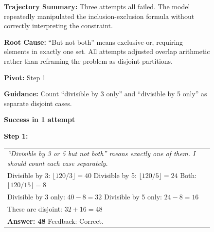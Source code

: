 \begin{figure}[b]
\begin{tcolorbox}
\end{tcolorbox}

\vspace{0.5em}

\begin{tcolorbox}[
    colback=gray!8,
    colframe=black!70,
    title=\textbf{Reflection Output},
    fonttitle=\bfseries\small,
    width=\textwidth,
    boxrule=0.5pt
]
\footnotesize

\textbf{Trajectory Summary:} Three attempts all failed. The model repeatedly manipulated the inclusion-exclusion formula without correctly interpreting the constraint.

\vspace{0.3em}
\textbf{Root Cause:} ``But not both'' means exclusive-or, requiring elements in exactly one set. All attempts adjusted overlap arithmetic rather than reframing the problem as disjoint partitions.

\vspace{0.3em}
\textbf{Pivot:} Step 1

\vspace{0.3em}
\textbf{Guidance:} Count ``divisible by 3 only'' and ``divisible by 5 only'' as separate disjoint cases.

\end{tcolorbox}

\vspace{0.5em}

\begin{tcolorbox}[
    colback=white,
    colframe=black!70,
    title=\textbf{Retry Trajectory (guidance removed for training)},
    fonttitle=\bfseries\small,
    width=\textwidth,
    boxrule=0.5pt
]

\hfill \textcolor{green!50!black}{\textbf{Success in 1 attempt}}

\vspace{0.5em}

\textbf{Step 1:}\par
\footnotesize
\begin{tabularx}{\linewidth}{@{}X@{}}
\textit{``Divisible by 3 or 5 but not both'' means exactly one of them. I should count each case separately.} \\[0.2em]
Divisible by 3: $\lfloor 120/3 \rfloor = 40$ \quad Divisible by 5: $\lfloor 120/5 \rfloor = 24$ \quad Both: $\lfloor 120/15 \rfloor = 8$ \\[0.2em]
Divisible by 3 only: $40 - 8 = 32$ \quad Divisible by 5 only: $24 - 8 = 16$ \\[0.2em]
These are disjoint: $32 + 16 = 48$ \\[0.2em]
\textbf{Answer: 48} \quad \textcolor{green!50!black}{Feedback: Correct.}
\end{tabularx}


\end{tcolorbox}
\end{figure}
